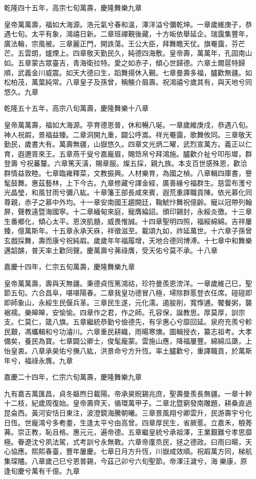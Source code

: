 \begin{pinyinscope}
乾隆四十五年，高宗七旬萬壽，慶隆舞樂九章

皇帝萬萬壽，福如大海源。浩元氣兮春和溫，澤洋溢兮彌乾坤。一章歲維庚子，恭遇七旬。太平有象，鴻禧日新。二章班禪覲後藏，十方皈依舉延企。瑞靄集豐年，廣法輪，宗風被。三章麗正門，開詄蕩。王公大臣，拜舞瞻天仗。旗罨靄，芬芒芒。五雲朗，爐煙上。四章敬天勤民久，純德四海敷。皇帝壽，萬萬年，孔固南山如。五章蒙古眾臺吉，青海衛拉特。愛之如赤子，傾心世歸德。六章土爾扈特歸順，武義金川威震。如天大德曰生，蹈舞揚休入覲。七章曼壽多福，臚歡無疆。如松柏茂，萬葉純常。八章皇子及孫曾，稱觴介眉壽。祝鴻禧兮歲其有，與天地兮同悠久。九章

乾隆五十五年，高宗八旬萬壽，慶隆舞樂十八章

皇帝萬萬壽，福如大海源。亭育德恩普，休和暢八埏。一章歲維庚戌，恭遇八旬。神人祝嘏，景福益臻。二章洞開九重，闢公呼嵩。祥光罨靄，歌舞攸同。三章敬天勤民，歲書大有。萬壽無疆，山嶽悠久。四章文光炳二曜，武烈宣萬方。義正以仁育，遐邇胥來王。五章燕千叟兮嘉龐眉，賜筇帛兮拜鴻施。臚歡介祉兮叩彤墀，群登壽兮祝蕃釐。六章篤天潢，賜章服。燦五採，親九族。本支百世感殊恩，歡洽群情益敦睦。七章臨雍釋菜，文教振興。人材樂育，為國之楨。八章輯四庫書，譽髦鼓舞。惠茲藝林，上下今古。九章修藏兮譯金經，廣善緣兮福群生。慈雲布濩兮光晶瑩，和風甘雨兮彌八紘。十章籓王部長咸來賓，遐荒重譯職貢陳。依光慕化同尊親，赤子之慕中外均。十一章安南國王趨闕廷，鞠鯱忭舞祝億齡。寵以冠帶列翰屏，聲教遠暨海國寧。十二章緬甸來庭，寵膺綸詔。頒印錫封，永綏炎徼。十三章生番鄉化，傾心太平。恩浹肌髓，威畏惟誠。十四章聖明四照，福綏綿綿。吉祥屢臻，億萬斯年。十五章永承天庥，祥徵滋至。載頌九如，祚延萬世。十六章子孫曾玄戲採舞，壽而康兮祝純嘏。歲歲年年福履增，天地合德同博溥。十七章中和舞樂邁韶韺，普天率土歡同聲。慶萬壽兮茀祿膺，受天佑兮莫不承。十八章

嘉慶十四年，仁宗五旬萬壽，慶隆舞樂九章

皇帝萬萬壽，壽與天無疆。秉德貞恆篤鴻祜，珍符曼羨恩滂洋。一章歲維己巳，聖節五旬。六合昌阜，啿啿陽春。二章我皇功德冒八極，埽除群慝登衣任席。磑磑即即師象山，永綏生民偃兵革。三章民生遂，元化濡。遏朘削，寬惸逋。饜餐粥，襲裾襦。樂皞皞，安愉愉。四章作之君，作之師。孔容保，誕教思。厚莫厚，訓宗支。仁莫仁，箴八旗。五章繼統恭勤兮儉德先，有孚惠心兮靡回延。泉府充羨兮軫民艱，馮蠵輯和兮功濬川。六章重民耕織，雨暘寒燠。圖輯授衣，纂志祖考。大孝備矣，養民為寶。七章闢公卿士，俊髦龐蒙。雲施山應，降福屢豐。綿綿瓜瓞，上怡皇衷。八章承昊佑兮撫八紘，洪景命兮方升恆。率土臚歡兮，重譯職貢，於萬斯年兮，福祿永膺。九章

嘉慶二十四年，仁宗六旬萬壽，慶隆舞樂九章

九有嘉吉萬匯昌，貞冬嫗煦日載陽。帝承昊貺錫兆庶，聖壽曼羨長無疆。一章十幹十二枝，紀歲周復始。皇帝壽齊天，循環萬甲子。二章北暨窮發南雕題，耕桑直過昆侖西。黃河安恬日東注，波澄鏡海騰朝曦。三章景風翔兮卿雲升，民游壽宇兮化日恆。世龐鴻兮多耇耋，生逢太平兮由高曾。四章厚民生，省厥慝。立嘉禾，稂莠茀。崇正教，恥且格。惠元元，遍帝德。五章繼皇統兮承祖澤，王業艱難兮孝思靡極。眷遼沈兮夙法駕，式考訓兮永無斁。六章帝廑烝民，拯之德政。曰雨曰暘，天心協應。熙熙春臺，豐年屢慶。七章日月方升恆，川嶽咸效順。祝嘏萬方同，梯航集琛贐。八章歲己巳兮恩普錫，今茲己卯兮六旬聖節。帝澤汪濊兮，海樂康，原逢旬慶兮萬有千億。九章


\end{pinyinscope}
